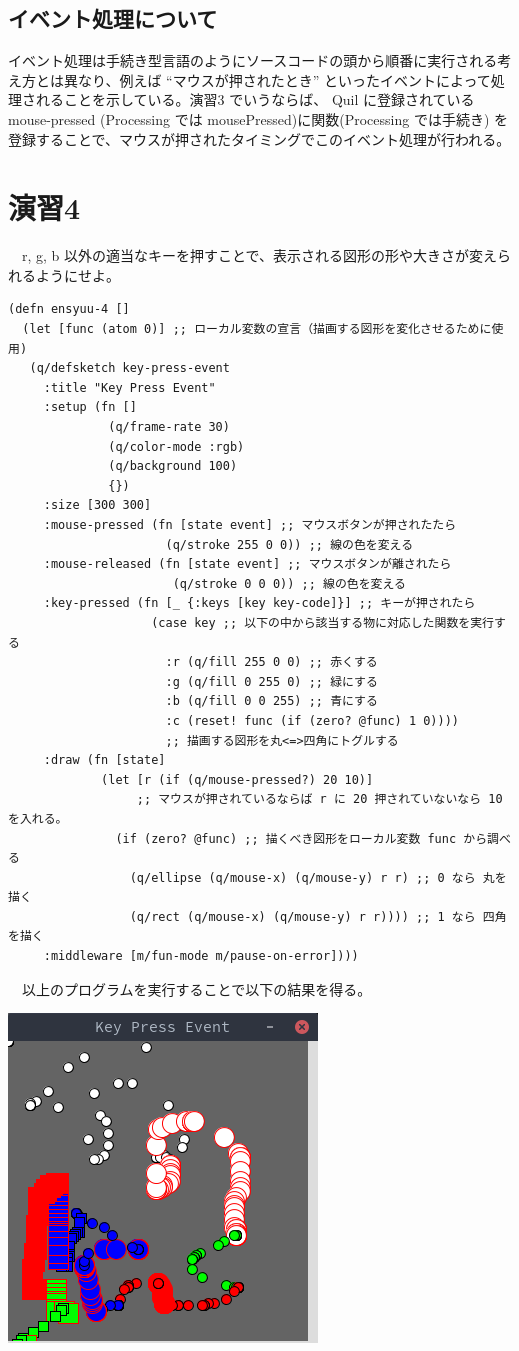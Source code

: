 \documentclass{scrartcl}
\begin{document}
\subsection{イベント処理について}
\label{sec:org4a9d419}
イベント処理は手続き型言語のようにソースコードの頭から順番に実行される考え方とは異なり、例えば ``マウスが押されたとき'' といったイベントによって処理されることを示している。演習3 でいうならば、 Quil に登録されている mouse-pressed (Processing では mousePressed)に関数(Processing では手続き) を登録することで、マウスが押されたタイミングでこのイベント処理が行われる。\\

\section{演習4}
\label{sec:org85b5f83}
　r, g, b 以外の適当なキーを押すことで、表示される図形の形や大きさが変えられるようにせよ。\\
\begin{verbatim}
(defn ensyuu-4 []
  (let [func (atom 0)] ;; ローカル変数の宣言（描画する図形を変化させるために使用)
   (q/defsketch key-press-event
     :title "Key Press Event"
     :setup (fn []
              (q/frame-rate 30)
              (q/color-mode :rgb)
              (q/background 100)
              {})
     :size [300 300]
     :mouse-pressed (fn [state event] ;; マウスボタンが押されたたら
                      (q/stroke 255 0 0)) ;; 線の色を変える
     :mouse-released (fn [state event] ;; マウスボタンが離されたら
                       (q/stroke 0 0 0)) ;; 線の色を変える
     :key-pressed (fn [_ {:keys [key key-code]}] ;; キーが押されたら
                    (case key ;; 以下の中から該当する物に対応した関数を実行する
                      :r (q/fill 255 0 0) ;; 赤くする
                      :g (q/fill 0 255 0) ;; 緑にする
                      :b (q/fill 0 0 255) ;; 青にする
                      :c (reset! func (if (zero? @func) 1 0))))
                      ;; 描画する図形を丸<=>四角にトグルする
     :draw (fn [state]
             (let [r (if (q/mouse-pressed?) 20 10)]
             　　　;; マウスが押されているならば r に 20 押されていないなら 10 を入れる。
               (if (zero? @func) ;; 描くべき図形をローカル変数 func から調べる
                 (q/ellipse (q/mouse-x) (q/mouse-y) r r) ;; 0 なら 丸を描く
                 (q/rect (q/mouse-x) (q/mouse-y) r r)))) ;; 1 なら 四角を描く
     :middleware [m/fun-mode m/pause-on-error])))
\end{verbatim}
　以上のプログラムを実行することで以下の結果を得る。\\
\begin{center}
\includegraphics[width=0.3\linewidth]{./img/ensyuu4.png}
\end{center}
\end{document}
